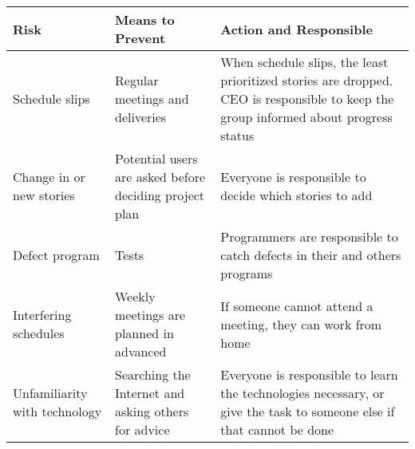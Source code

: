 \documentclass[pdftex, 12pt, norsk, a4paper, twoside]{article}
\numberwithin{equation}{section}
\numberwithin{figure}{section}
\numberwithin{table}{section}
\begin{document}
\begin{center} %

\subsection*{}
\hfill

\begin{tabular}{ |  >{\centering\arraybackslash} m{3cm} | >{\centering\arraybackslash} m{4cm} | >{\centering\arraybackslash} m{6cm} | }
\hline
\rowcolor{Gray}
\textbf{Risk}& \textbf{Means to Prevent} & \textbf{Action and Responsible} \\ 
\hline
Schedule slips& Regular meetings and deliveries& When schedule slips, the least prioritized stories are dropped. CEO is responsible to keep the group informed about progress status \\
\hline
Change in or new stories& Potential users are asked before deciding project plan& Everyone is responsible to decide which stories to add \\
\hline
Defect program& Tests& Programmers are responsible to catch defects in their and others programs \\
\hline
Interfering schedules& Weekly meetings are planned in advanced& If someone cannot attend a meeting, they can work from home \\
\hline
Unfamiliarity with technology& Searching the Internet and asking others for advice& Everyone is responsible to learn the technologies necessary, or give the task to someone else if that cannot be done \\
\hline
\end{tabular}
\end{center} %
\end{document}
